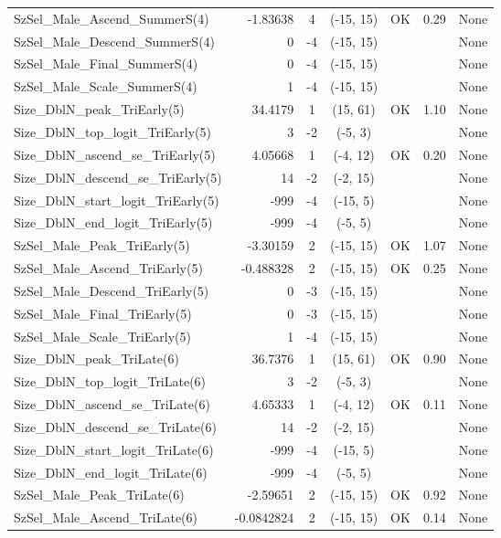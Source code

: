 \documentclass[12pt,]{article}
\begin{document}
\begin{landscape}
\begin{longtable}{lrcccll}
  SzSel\_Male\_Ascend\_SummerS(4) & -1.83638 & 4 & (-15, 15) & OK & 0.29 & None \\ 
  SzSel\_Male\_Descend\_SummerS(4) & 0 & -4 & (-15, 15) &  &  & None \\ 
  SzSel\_Male\_Final\_SummerS(4) & 0 & -4 & (-15, 15) &  &  & None \\ 
  SzSel\_Male\_Scale\_SummerS(4) & 1 & -4 & (-15, 15) &  &  & None \\ 
  Size\_DblN\_peak\_TriEarly(5) & 34.4179 & 1 & (15, 61) & OK & 1.10 & None \\ 
  Size\_DblN\_top\_logit\_TriEarly(5) & 3 & -2 & (-5, 3) &  &  & None \\ 
  Size\_DblN\_ascend\_se\_TriEarly(5) & 4.05668 & 1 & (-4, 12) & OK & 0.20 & None \\ 
  Size\_DblN\_descend\_se\_TriEarly(5) & 14 & -2 & (-2, 15) &  &  & None \\ 
  Size\_DblN\_start\_logit\_TriEarly(5) & -999 & -4 & (-15, 5) &  &  & None \\ 
  Size\_DblN\_end\_logit\_TriEarly(5) & -999 & -4 & (-5, 5) &  &  & None \\ 
  SzSel\_Male\_Peak\_TriEarly(5) & -3.30159 & 2 & (-15, 15) & OK & 1.07 & None \\ 
  SzSel\_Male\_Ascend\_TriEarly(5) & -0.488328 & 2 & (-15, 15) & OK & 0.25 & None \\ 
  SzSel\_Male\_Descend\_TriEarly(5) & 0 & -3 & (-15, 15) &  &  & None \\ 
  SzSel\_Male\_Final\_TriEarly(5) & 0 & -3 & (-15, 15) &  &  & None \\ 
  SzSel\_Male\_Scale\_TriEarly(5) & 1 & -4 & (-15, 15) &  &  & None \\ 
  Size\_DblN\_peak\_TriLate(6) & 36.7376 & 1 & (15, 61) & OK & 0.90 & None \\ 
  Size\_DblN\_top\_logit\_TriLate(6) & 3 & -2 & (-5, 3) &  &  & None \\ 
  Size\_DblN\_ascend\_se\_TriLate(6) & 4.65333 & 1 & (-4, 12) & OK & 0.11 & None \\ 
  Size\_DblN\_descend\_se\_TriLate(6) & 14 & -2 & (-2, 15) &  &  & None \\ 
  Size\_DblN\_start\_logit\_TriLate(6) & -999 & -4 & (-15, 5) &  &  & None \\ 
  Size\_DblN\_end\_logit\_TriLate(6) & -999 & -4 & (-5, 5) &  &  & None \\ 
  SzSel\_Male\_Peak\_TriLate(6) & -2.59651 & 2 & (-15, 15) & OK & 0.92 & None \\ 
  SzSel\_Male\_Ascend\_TriLate(6) & -0.0842824 & 2 & (-15, 15) & OK & 0.14 & None \\ 

\end{longtable}
\end{landscape}
\end{document}
